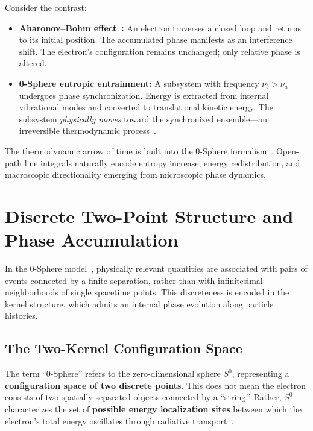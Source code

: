 \documentclass[12pt,letterpaper]{article}
\begin{document}
Consider the contrast:
\begin{itemize}
\item \textbf{Aharonov--Bohm effect~\cite{ABEffect}:} An electron traverses a closed loop and returns to its initial position. The accumulated phase manifests as an interference shift. The electron's configuration remains unchanged; only relative phase is altered.

\item \textbf{0-Sphere entropic entrainment:} A subsystem with frequency $\nu_b > \nu_a$ undergoes phase synchronization. Energy is extracted from internal vibrational modes and converted to translational kinetic energy. The subsystem \textit{physically moves} toward the synchronized ensemble---an irreversible thermodynamic process~\cite{hanamura18356895}.
\end{itemize}

The thermodynamic arrow of time is built into the 0-Sphere formalism~\cite{hanamura16759284}. Open-path line integrals naturally encode entropy increase, energy redistribution, and macroscopic directionality emerging from microscopic phase dynamics.


\section{Discrete Two-Point Structure and Phase Accumulation}
\label{sec:twokernel}

\justifying
In the 0-Sphere model~\cite{hanamura16759284}, physically relevant quantities are associated with pairs of events connected by a finite separation, rather than with infinitesimal neighborhoods of single spacetime points. This discreteness is encoded in the kernel structure, which admits an internal phase evolution along particle histories.

\subsection{The Two-Kernel Configuration Space}

The term ``0-Sphere'' refers to the zero-dimensional sphere $S^0$, representing a \textbf{configuration space of two discrete points}. This does not mean the electron consists of two spatially separated objects connected by a ``string.'' Rather, $S^0$ characterizes the set of \textbf{possible energy localization sites} between which the electron's total energy oscillates through radiative transport~\cite{hanamura16759284}.
\end{document}
